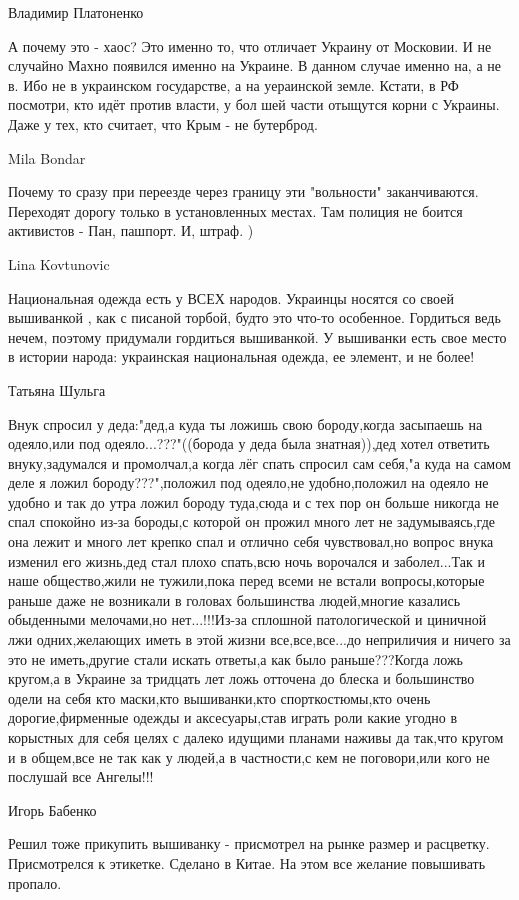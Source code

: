 Владимир Платоненко

А почему это - хаос? Это именно то, что отличает Украину от Московии. И не
случайно Махно появился именно на Украине. В данном случае именно на, а не в.
Ибо не в украинском государстве, а на уераинской земле.  Кстати, в РФ посмотри,
кто идёт против власти, у бол шей части отыщутся корни с Украины. Даже у тех,
кто считает, что Крым - не бутерброд.

Mila Bondar

Почему то сразу при переезде через границу эти "вольности" заканчиваются.
Переходят дорогу только в установленных местах. Там полиция не боится
активистов - Пан, пашпорт. И, штраф. )

Lina Kovtunovic

Национальная одежда есть у ВСЕХ народов. Украинцы носятся со своей вышиванкой ,
как с писаной торбой, будто это что-то особенное. Гордиться ведь нечем, поэтому
придумали гордиться вышиванкой. У вышиванки есть свое место в истории народа:
украинская национальная одежда, ее элемент, и не более!

Татьяна Шульга

Внук спросил у деда:"дед,а куда ты ложишь свою бороду,когда засыпаешь на
одеяло,или под одеяло...???"((борода у деда была знатная)),дед хотел ответить
внуку,задумался и промолчал,а когда лёг спать спросил сам себя,"а куда на самом
деле я ложил бороду???",положил под одеяло,не удобно,положил на одеяло не
удобно и так до утра ложил бороду туда,сюда и с тех пор он больше никогда не
спал спокойно из-за бороды,с которой он прожил много лет не задумываясь,где она
лежит и много лет крепко спал и отлично себя чувствовал,но вопрос внука изменил
его жизнь,дед стал плохо спать,всю ночь ворочался и заболел...Так и наше
общество,жили не тужили,пока перед всеми не встали вопросы,которые раньше даже
не возникали в головах большинства людей,многие казались обыденными мелочами,но
нет...!!!Из-за сплошной патологической и циничной лжи одних,желающих иметь в
этой жизни все,все,все...до неприличия и ничего за это не иметь,другие стали
искать ответы,а как было раньше???Когда ложь кругом,а в Украине за тридцать лет
ложь отточена до блеска и большинство одели на себя кто маски,кто вышиванки,кто
спорткостюмы,кто очень дорогие,фирменные одежды и аксесуары,став играть роли
какие угодно в корыстных для себя целях с далеко идущими планами наживы да
так,что кругом и в общем,все не так как у людей,а в частности,с кем не
поговори,или кого не послушай все Ангелы!!!

Игорь Бабенко

Решил тоже прикупить вышиванку - присмотрел на рынке размер и расцветку.
Присмотрелся к этикетке. Сделано в Китае. На этом все желание повышивать
пропало.
